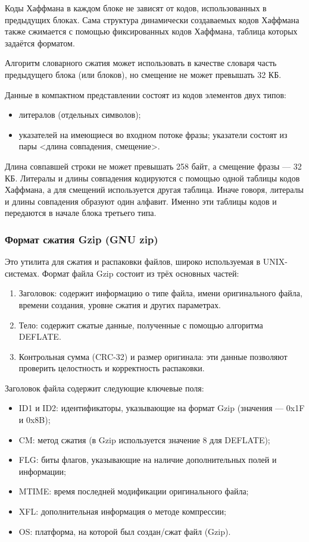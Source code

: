 \documentclass[12pt]{article}
\begin{document}
Коды Хаффмана в каждом блоке не зависят от кодов, использованных в предыдущих блоках.
Сама структура динамически создаваемых кодов Хаффмана также сжимается с помощью фиксированных кодов Хаффмана,
таблица которых задаётся форматом.

Алгоритм словарного сжатия может использовать в качестве словаря часть предыдущего блока (или блоков),
но смещение не может превышать 32 КБ.

Данные в компактном представлении состоят из кодов элементов двух типов:

\begin{itemize}[label=-]
\item литералов (отдельных символов);
\item указателей на имеющиеся во входном потоке фразы; указатели состоят из пары
<длина совпадения, смещение>.
\end{itemize}

Длина совпавшей строки не может превышать 258 байт, а смещение фразы — 32 КБ.
Литералы и длины совпадения кодируются с помощью одной таблицы кодов Хаффмана,
а для смещений используется другая таблица.
Иначе говоря, литералы и длины совпадения образуют один алфавит.
Именно эти таблицы кодов и передаются в начале блока третьего типа.

\subsubsection{Формат сжатия Gzip (GNU zip)}

Это утилита для сжатия и распаковки файлов, широко используемая в UNIX-системах.
Формат файла Gzip состоит из трёх основных частей:

\begin{enumerate}
\item Заголовок: содержит информацию о типе файла, имени оригинального файла, времени создания, уровне сжатия и других параметрах.
\item Тело: содержит сжатые данные, полученные с помощью алгоритма DEFLATE.
\item Контрольная сумма (CRC-32) и размер оригинала: эти данные позволяют проверить целостность и корректность распаковки.
\end{enumerate}

Заголовок файла содержит следующие ключевые поля:

\begin{itemize}[label=-]
\item ID1 и ID2: идентификаторы, указывающие на формат Gzip (значения — 0x1F и 0x8B);
\item CM: метод сжатия (в Gzip используется значение 8 для DEFLATE);
\item FLG: биты флагов, указывающие на наличие дополнительных полей и информации;
\item MTIME: время последней модификации оригинального файла;
\item XFL: дополнительная информация о методе компрессии;
\item OS: платформа, на которой был создан/сжат файл (Gzip).
\end{itemize}
\end{document}
